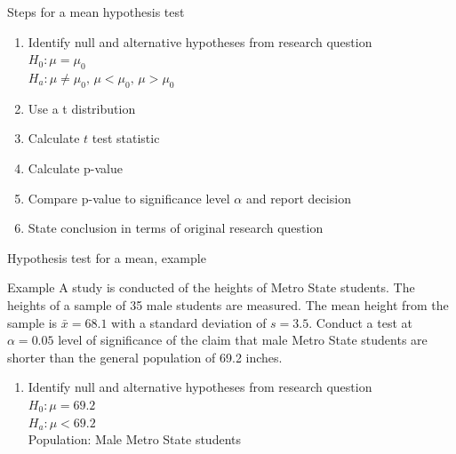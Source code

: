 \documentclass[xcolor=table, handout]{beamer}
\begin{document}
\begin{frame}{Steps for a mean hypothesis test}
\begin{block}{}
\large
\begin{enumerate}
\item Identify null and alternative hypotheses from research question\\
$H_0: \mu = \mu_0$\\
$H_a: \mu \ne \mu_0, \, \mu < \mu_0, \, \mu> \mu_0$
\item Use a t distribution
\item Calculate $t$ test statistic
\item Calculate p-value
\item Compare p-value to significance level $\alpha$ and report decision
\item State conclusion in terms of original research question
\end{enumerate}
\end{block}
\end{frame}

\begin{frame}{Hypothesis test for a mean, example}
\begin{exampleblock}{Example}
\large
A study is conducted of the heights of Metro State students. The heights of a sample of 35 male students are measured. The mean height from the sample is $\bar x = 68.1$ with a standard deviation of $s=3.5$. Conduct a test at $\alpha=0.05$ level of significance of the claim that male Metro State students are shorter than the general population of 69.2 inches.
\begin{enumerate}
\pause\item Identify null and alternative hypotheses from research question\\
\pause$H_0: \mu = 69.2$\\
$H_a: \mu < 69.2$\\
Population: Male Metro State students
\end{enumerate}
\end{exampleblock}
\end{frame}
\end{document}
